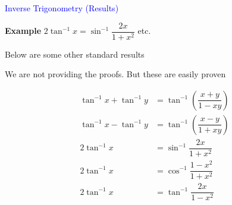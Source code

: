 \documentclass[14pt,fleqn]{extarticle}
\begin{document}
\begin{skill}
\textcolor{blue}{Inverse Trigonometry (Results)} 

\small\textbf{Example } $2\tan^{-1} x = \sin^{-1}\dfrac{2x}{1+x^2}$ etc. 
\end{skill}

\newcard 

Below are some other standard
results\newline 

We are not providing the
proofs. But these are easily 
proven

%
\begin{align}
\tan^{-1}x + \tan^{-1}y &= \tan^{-1}\left( \dfrac{x+y}{1-xy}\right) \\
\tan^{-1}x - \tan^{-1}y &= \tan^{-1}\left( \dfrac{x-y}{1+xy}\right) \\
2\tan^{-1} x &= \sin^{-1}\dfrac{2x}{1+x^2} \\
2\tan^{-1} x &= \cos^{-1}\dfrac{1-x^2}{1+x^2} \\
2\tan^{-1} x &= \tan^{-1}\dfrac{2x}{1-x^2} \\
\end{align}
\end{document}
